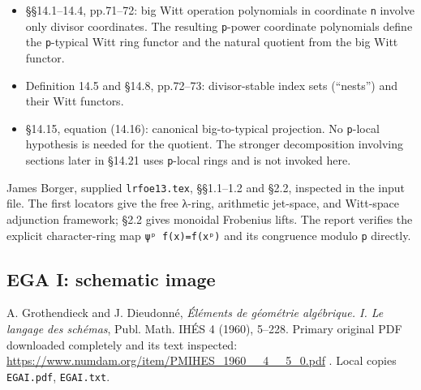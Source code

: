 \documentclass[
  10pt,
]{article}
\providecommand{\tightlist}{%
  \setlength{\itemsep}{0pt}\setlength{\parskip}{0pt}}
\providecommand{\tightlist}{\setlength{\itemsep}{0pt}\setlength{\parskip}{0pt}}
\begin{document}
\begin{itemize}
\tightlist
\item
  §§14.1--14.4, pp.71--72: big Witt operation polynomials in coordinate
  \texttt{\small n} involve only divisor coordinates. The resulting
  \texttt{\small p}-power coordinate polynomials define the
  \texttt{\small p}-typical Witt ring functor and the natural quotient
  from the big Witt functor.
\item
  Definition 14.5 and §14.8, pp.72--73: divisor-stable index sets
  (``nests'') and their Witt functors.
\item
  §14.15, equation (14.16): canonical big-to-typical projection. No
  \texttt{\small p}-local hypothesis is needed for the quotient. The
  stronger decomposition involving sections later in §14.21 uses
  \texttt{\small p}-local rings and is not invoked here.
\end{itemize}

James Borger, supplied \texttt{\small lrfoe13.tex}, §§1.1--1.2 and §2.2,
inspected in the input file. The first locators give the free λ-ring,
arithmetic jet-space, and Witt-space adjunction framework; §2.2 gives
monoidal Frobenius lifts. The report verifies the explicit
character-ring map
\texttt{\small ψᵖ f(\allowbreak{}x)\allowbreak{}=\allowbreak{}f(\allowbreak{}xᵖ)\allowbreak{}}
and its congruence modulo \texttt{\small p} directly.

\subsection{EGA I: schematic image}\label{ega-i-schematic-image}

A. Grothendieck and J. Dieudonné, \emph{Éléments de géométrie
algébrique. I. Le langage des schémas}, Publ. Math. IHÉS 4 (1960),
5--228. Primary original PDF downloaded completely and its text
inspected: \url{https://www.numdam.org/item/PMIHES_1960__4__5_0.pdf} .
Local copies \texttt{\small EGAI.pdf}, \texttt{\small EGAI.txt}.
\end{document}
